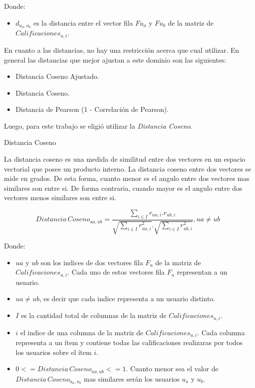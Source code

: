 \documentclass[11pt,a4paper,twoside]{thesis}
\begin{document}
\begin{description}
	\item[Donde:]
\end{description}
\begin{itemize}
	\item $d_{u_a,u_b}$ es la distancia entre el vector fila $F{u_a}$ y $F{u_b}$ de la matriz de $Calificaciones_{u,i}$.
\end{itemize}

En cuanto a las distancias, no hay una restricción acerca que cual utilizar. En
general las distancias que mejor ajustan a este dominio son las siguientes:

\begin{itemize}
	\item Distancia Coseno Ajustado.
	\item Distancia Coseno.
	\item Distancia de Pearson (1 - Correlación de Pearson).
\end{itemize}

Luego, para este trabajo se eligió utilizar la \textit{Distancia Coseno}.

\begin{description}
	\item[Distancia Coseno]
\end{description}

La distancia coseno es una medida de similitud entre dos vectores en un espacio
vectorial que posee un producto interno. La distancia coseno entre dos vectores
se mide en grados. De esta forma, cuanto menor es el angulo entre dos vectores
mas similares son entre si. De forma contraria, cuando mayor es el angulo entre
dos vectores menos similares son entre si.

\begin{equation}
	Distancia \mspace{3mu}Coseno_{ua, ub} = \frac{ \sum_{i \in I} r_{ua, i}.r_{ub, i}}{\sqrt{\sum_{i \in I} r_{ua, i}^2}.\sqrt{\sum_{i \in I} r_{ub, i}^2}  }, ua \neq ub
\end{equation}

\begin{description}
	\item[Donde:]
\end{description}
\begin{itemize}
	\item $ua$ y $ub$ son los indices de dos vectores fila $F_u$ de la matriz de $Calificaciones_{u,i}$. Cada uno de estos vectores fila $F_u$ representan a un usuario.
	\item $ua \neq ub$, es decir que cada indice representa a un usuario distinto.
	\item $I$ es la cantidad total de columnas de la matriz de $Calificaciones_{u,i}$.
	\item $i$ el indice de una columna de la matriz de $Calificaciones_{u,i}$. Cada columna representa a un ítem y contiene todas las calificaciones realizaras por todos los usuarios sobre el ítem $i$.
	\item $0 <= Distancia \mspace{3mu} Coseno_{ua, ub} <= 1$. Cuanto menor sea el valor de $Distancia \mspace{3mu} Coseno_{u_a, u_b}$ mas similares serán los usuarios $u_a$ y $u_b$.
\end{itemize}
\end{document}
